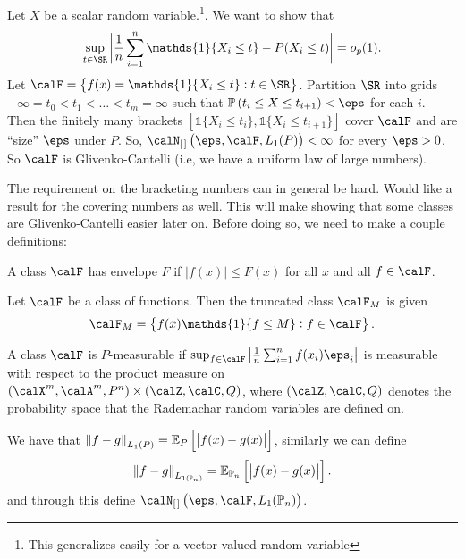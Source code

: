 \begin{example*}
	Let \(X\) be a scalar random variable.\footnote{This generalizes easily for a vector valued random variable}. We want to show that 
	\[
		\sup_{t\in\SR}\bigg| \frac{1}{n}\sum_{i=1}^n \mathds{1}\{X_i\leq t\}-P(X_i\leq t)\bigg|=o_p(1)
	.\]
	Let \(\calF = \left\{f(x)=\mathds{1}\{X_i\leq t\}: t \in \SR\right\}\). Partition \(\SR\) into grids  \(-\infty = t_0 < t_1 < \dots< t_m = \infty\) such that \(\P\left(t_i \leq X \leq t_{i+1}\right)<\eps\) for each \(i\). Then the finitely many brackets \(\left[\mathds{1}\{X_i \leq t_i\},\mathds{1}\{X_i \leq t_{i+1}\}\right]\) cover \(\calF\) and are ``size'' \(\eps\) under \(P\). So, \(\calN_{[\hspace{0.1em}]}\left(\eps,\calF,L_1(P)\right)<\infty\) for every \(\eps>0\). So \(\calF\) is Glivenko-Cantelli (i.e, we have a uniform law of large numbers).
\end{example*}
The requirement on the bracketing numbers can in general be hard. Would like a result for the covering numbers as well. This will make showing that some classes are Glivenko-Cantelli easier later on. Before doing so, we need to make a couple definitions:
\begin{definition}[Envelope]
	\label{def:envelope}
	A class \(\calF\) has envelope \(F\) if \(|f(x)|\leq F(x)\) for all \(x\) and all \(f\in\calF\).
\end{definition}
\begin{definition}
	\label{def:truncated-class}
	Let \(\calF\) be a class of functions. Then the truncated class \(\calF_M\) is given 
	\[
		\calF_M = \left\{f(x)\mathds{1}\{f \leq M\}: f\in\calF\right\}	
	.\]
\end{definition}
\begin{definition}
	\label{def:p-measurable-class}
	A class \(\calF\) is \(P\)-measurable if \(\sup_{f\in\calF}\left|\frac{1}{n}\sum_{i=1}^n f(x_i)\eps_i\right|\) is measurable with respect to the product measure on \((\calX^m,\calA^m,P^n)\times(\calZ,\calC,Q)\), where \((\calZ,\calC,Q)\) denotes the probability space that the Rademachar random variables are defined on.
\end{definition}
\begin{definition}[\(L_p(\P_n)\)-norm]
	\label{def:lpn-norm}
	We have that \(\left\|f-g\right\|_{L_1(P)} = \mathbb{E}_P\left[\left|f(x)-g(x)\right|\right]\), similarly we can define 
	\[
			\left\|f-g\right\|_{L_{1(\mathbb{P}_n)}} = \mathbb{E}_{\mathbb{P}_n}\left[\left|f(x)-g(x)\right|\right]
	.\]
	and through this define \(\calN_{[\hspace{0.1em}]}\left(\eps,\calF,L_1(\P_n)\right)\).
\end{definition}

